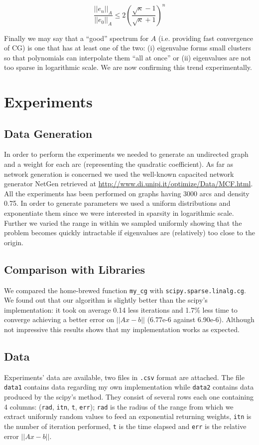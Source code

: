 \documentclass[12pt]{article}
\newcommand{\1}{\mathbbm{1}}
\begin{document}
$$ \frac{||e_n||_A}{||e_0||_A} \leq 2 \left(\frac{\sqrt{\kappa} - 1}{\sqrt{\kappa} + 1}\right)^n $$

Finally we may say that a ``good'' spectrum for $A$ (i.e. providing fast convergence of CG) is one that has at least one of the two: (i) eigenvalue forms small clusters so that polynomials can interpolate them ``all at once'' or (ii) eigenvalues are not too sparse in logarithmic scale. We are now confirming this trend experimentally. 

\section{Experiments}
\subsection{Data Generation}
In order to perform the experiments we needed to generate an undirected graph and a weight for each arc (representing the quadratic coefficient). As far as network generation is concerned we used the well-known capacited network generator NetGen retrieved at \href{http://www.di.unipi.it/optimize/Data/MCF.html}{http://www.di.unipi.it/optimize/Data/MCF.html}. All the experiments has been performed on graphs having 3000 arcs and density 0.75. In order to generate parameters we used a uniform distributions and exponentiate them since we were interested in sparsity in logarithmic scale. Further we varied the range in within we sampled uniformly showing that the problem becomes quickly intractable if eigenvalues are (relatively) too close to the origin.

\subsection{Comparison with Libraries}
We compared the home-brewed function \texttt{my\_cg} with \texttt{scipy.sparse.linalg.cg}. We found out that our algorithm is slightly better than the scipy's implementation: it took on average 0.14 less iterations and 1.7\% less time to converge achieving a better error on $||Ax - b||$ (6.77e-6 against 6.90e-6). Although not impressive this results shows that my implementation works as expected.

\subsection{Data}
Experiments' data are available, two files in \texttt{.csv} format are attached. The file \texttt{data1} contains data regarding my own implementation while \texttt{data2} contains data produced by the scipy's method. They consist of several rows each one containing 4 columns: (\texttt{rad}, \texttt{itn}, \texttt{t}, \texttt{err}); \texttt{rad} is the radius of the range from which we extract uniformly random values to feed an exponential returning weights, \texttt{itn} is the number of iteration performed, \texttt{t} is the time elapsed and \texttt{err} is the relative error $||Ax - b||$.
\end{document}
